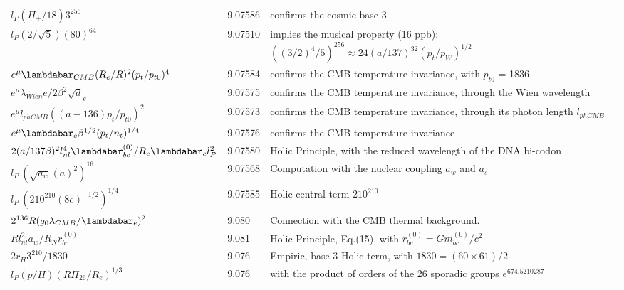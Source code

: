 \documentclass[a4paper,9pt]{article}
\begin{document}
\begin{table}
\begin{tabular}{lll}
 
 $ l_P (\Pi_+/18)3^{256}$ & 9.07586 & confirms the cosmic base 3 \\
 
 $ l_P (2/\sqrt5)(80)^{64}$ & 9.07510 & implies the musical property (16 ppb): $((3/2)^4/5)^{256} \approx 24 (a/137)^{32}(p_t/p_W)^{1/2}$ \\
 
 $ e^{\mu} \lambdabar_{CMB} (R_e/R)^2 (p_t/p_{t0})^4$ & 9.07584 & confirms the CMB temperature invariance, with $p_{t0}$ = 1836 \\
 
 $ e^{\mu} \lambda_{Wien} e/2\beta^2 \sqrt d_e$ & 9.07575 & confirms the CMB temperature invariance, through the Wien wavelength\\
 
 
 $ e^{\mu} l_{phCMB} ((a-136)p_t/p_{t0})^2$ & 9.07573 & confirms the CMB temperature invariance, through its photon length $l_{phCMB}$\\
 
 
 $ e^{\mu} \lambdabar_{e} \beta^{1/2} (p_t/n_t)^{1/4} $ & 9.07576 & confirms the CMB temperature invariance \\
 
 
 $ 2(a/137\beta)^2 l_{nl}^4 \lambdabar_{bc}^{(0)}/R_e \lambdabar_el_P^2 $ & 9.07580 & Holic Principle, with the reduced wavelength of the DNA bi-codon \\
 
 
 
 $ l_P ~ (\sqrt{a_w}(a)^2)^{16}  $ & 9.07568 & Computation with the nuclear coupling $a_w$ and $a_s$  \\
 
 $ l_P ~ (210^{210}(8e)^{-1/2})^{1/4}  $ & 9.07585 & Holic central term $210^{210}$  \\
 
 
 $ 2^{136}R(g_0\lambda_{CMB}/\lambdabar_e)^2  $ & 9.080 & Connection with the CMB thermal background.    \\
 
 $ Rl_{nl}^2a_w/R_Nr_{bc}^{(0)} $ & 9.081 & Holic Principle, Eq.(15), with $ r_{bc}^{(0)}= Gm_{bc}^{(0)}/c^2$    \\
 
 $ 2r_H 3^{210}/1830$& 9.076 & Empiric, base 3 Holic term, with $ 1830 = (60\times 61)/2 $   \\
  
  $l_P(p/H) (R \Pi_{26}/R_e)^{1/3} $ & 9.076 & with the product of orders of the 26 sporadic groups $e^{674.5210287}$ \cite{Sanchez2}  \\ 
  

\end{tabular}
\end{table}
\end{document}
